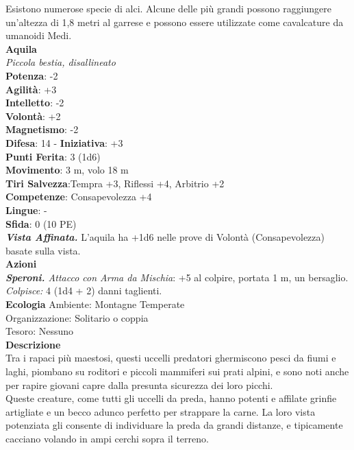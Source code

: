 \begin{multicols}{2}
Esistono numerose specie di alci. Alcune delle più grandi possono raggiungere un'altezza di 1,8 metri al garrese e possono essere utilizzate come cavalcature da umanoidi Medi.\\


\medskip\textbf{Aquila}\\
\emph{Piccola bestia, disallineato}\\
\textbf{Potenza}: -2\\
\textbf{Agilità}: +3\\
\textbf{Intelletto}: -2\\
\textbf{Volontà}: +2\\
\textbf{Magnetismo}: -2\\
\textbf{Difesa}: 14 - \textbf{Iniziativa}: +3\\
\textbf{Punti Ferita}: 3 (1d6)\\
\textbf{Movimento}: 3 m, volo 18 m\\
\textbf{Tiri Salvezza}:Tempra +3, Riflessi +4, Arbitrio +2\\
\textbf{Competenze}: Consapevolezza +4\\
\textbf{Lingue}: -\\
\textbf{Sfida}: 0 (10 PE)\smallskip\\
\emph{\textbf{Vista Affinata.}} L'aquila ha +1d6 nelle prove di Volontà (Consapevolezza) basate sulla vista.\\
\smallskip\textbf{Azioni}\\
\emph{\textbf{Speroni.} Attacco con Arma da Mischia}: +5 al colpire, portata 1 m, un bersaglio.\\
\emph{Colpisce:} 4 (1d4 + 2) danni taglienti.\\
\textbf{Ecologia}
Ambiente: Montagne Temperate\\
Organizzazione: Solitario o coppia\\
Tesoro: Nessuno\\
\textbf{Descrizione}\\
Tra i rapaci più maestosi, questi uccelli predatori ghermiscono pesci da fiumi e laghi, piombano su roditori e piccoli mammiferi sui prati alpini, e sono noti anche per rapire giovani capre dalla presunta sicurezza dei loro picchi.\\

Queste creature, come tutti gli uccelli da preda, hanno potenti e affilate grinfie artigliate e un becco adunco perfetto per strappare la carne. La loro vista potenziata gli consente di individuare la preda da grandi distanze, e tipicamente cacciano volando in ampi cerchi sopra il terreno.\\


\end{multicols}
